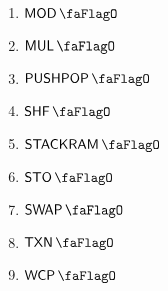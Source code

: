 \begin{description}
\begin{multicols}{3}
\begin{enumerate}
				\item $\modFlag$
				\item $\mulFlag$
				\item $\pushPopFlag$
				\item $\shfFlag$
				\item $\stackRamFlag$
				\item $\stoFlag$
				\item $\swapFlag$
				\item $\txnFlag$
				\item $\wcpFlag$
			\end{enumerate}
		\end{multicols}
\end{description}
